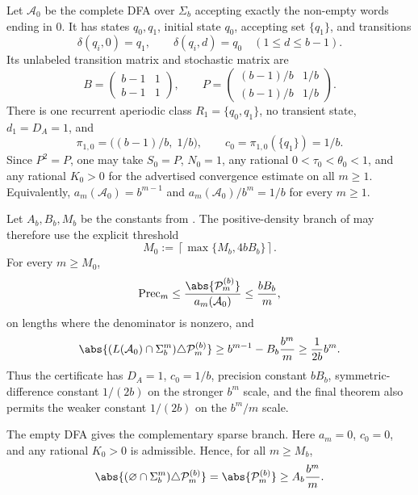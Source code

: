 \begin{example}
  \label{ex:base-ending-zero-certificate}
  Let \(\mathcal A_0\) be the complete DFA over \(\Sigma_b\) accepting
  exactly the non-empty words ending in \(0\). It has states
  \(q_0,q_1\), initial state \(q_0\), accepting set \(\{q_1\}\), and
  transitions
  \[
    \delta(q_i,0)=q_1,\qquad
    \delta(q_i,d)=q_0\quad(1\le d\le b-1).
  \]
  Its unlabeled transition matrix and stochastic matrix are
  \[
    B=\begin{pmatrix} b-1&1\\ b-1&1\end{pmatrix},
    \qquad
    P=\begin{pmatrix} (b-1)/b&1/b\\ (b-1)/b&1/b\end{pmatrix}.
  \]
  There is one recurrent aperiodic class \(R_1=\{q_0,q_1\}\), no
  transient state, \(d_1=D_A=1\), and
  \[
    \pi_{1,0}=\bigl((b-1)/b,\;1/b\bigr),\qquad
    c_0=\pi_{1,0}(\{q_1\})=1/b.
  \]
  Since \(P^2=P\), one may take \(S_0=P\), \(N_0=1\), any rational
  \(0<\tau_0<\theta_0<1\), and any rational \(K_0>0\) for the advertised
  convergence estimate on all \(m\ge1\). Equivalently,
  \(a_m(\mathcal A_0)=b^{m-1}\) and
  \(a_m(\mathcal A_0)/b^m=1/b\) for every \(m\ge1\).

  Let \(A_b,B_b,M_b\) be the constants from
  . The positive-density branch of
   may therefore use the
  explicit threshold
  \[
    M_0:=\left\lceil\max\{M_b,4bB_b\}\right\rceil .
  \]
  For every \(m\ge M_0\),
  \[
    \mathrm{Prec}_m
    \le
    \frac{\abs{\mathcal P_m^{(b)}}}{a_m(\mathcal A_0)}
    \le
    \frac{bB_b}{m},
  \]
  on lengths where the denominator is nonzero, and
  \[
    \abs{(L(\mathcal A_0)\cap\Sigma_b^m)\triangle\mathcal P_m^{(b)}}
    \ge
    b^{m-1}-B_b\frac{b^m}{m}
    \ge
    \frac{1}{2b}b^m .
  \]
  Thus the certificate has \(D_A=1\), \(c_0=1/b\), precision constant
  \(bB_b\), symmetric-difference constant \(1/(2b)\) on the stronger
  \(b^m\) scale, and the final theorem also permits the weaker constant
  \(1/(2b)\) on the \(b^m/m\) scale.

  The empty DFA gives the complementary sparse branch. Here
  \(a_m=0\), \(c_0=0\), and any rational \(K_0>0\) is admissible. Hence, for all
  \(m\ge M_b\),
  \[
    \abs{(\varnothing\cap\Sigma_b^m)\triangle\mathcal P_m^{(b)}}
    =
    \abs{\mathcal P_m^{(b)}}
    \ge
    A_b\frac{b^m}{m}.
  \]
\end{example}

